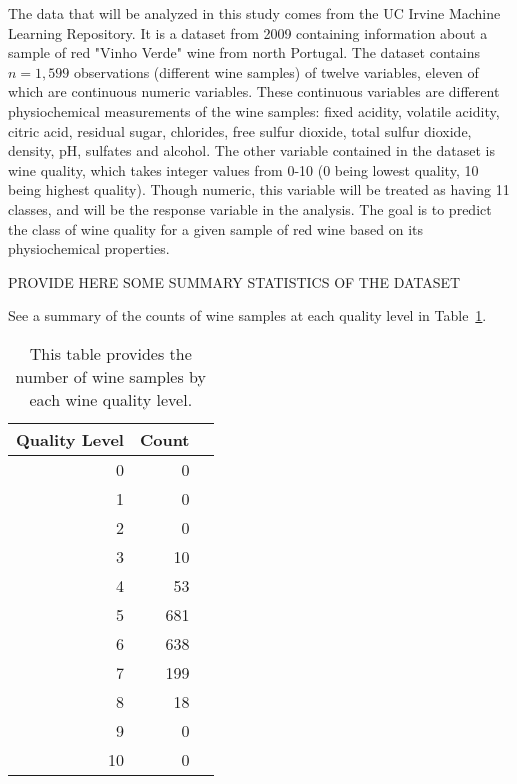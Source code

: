 \documentclass[12pt]{article}
\begin{document}
The data that will be analyzed in this study comes from the UC Irvine 
Machine Learning Repository.  It is a dataset from 2009 containing 
information about a sample of red "Vinho Verde" wine from north Portugal.  
The dataset contains $n=1,599$ observations (different wine samples) of 
twelve variables, eleven of which are continuous numeric variables.  
These continuous variables are different physiochemical measurements of 
the wine samples: fixed acidity, volatile acidity, citric acid, residual 
sugar, chlorides, free sulfur dioxide, total sulfur dioxide, density, 
pH, sulfates and alcohol.  The other variable contained in the dataset 
is wine quality, which takes integer values from 0-10 (0 being lowest 
quality, 10 being highest quality).  Though numeric, this variable will 
be treated as having 11 classes, and will be the response variable in 
the analysis.  The goal is to predict the class of wine quality for a 
given sample of red wine based on its physiochemical properties.  

PROVIDE HERE SOME SUMMARY STATISTICS OF THE DATASET

See a summary of the counts of wine samples at each quality level in 
Table~\ref{tab:qual}.
\begin{table}[tbp]
 \caption{This table provides the number of wine samples by each wine 
 quality level.}
\label{tab:qual}
\centering
\begin{tabular}{rrr}
 \toprule
 Quality Level & Count \\ 
 \midrule
0 & 0 \\ 
1 & 0 \\ 
2 & 0 \\ 
3 & 10 \\ 
4 & 53 \\ 
5 & 681 \\ 
6 & 638 \\ 
7 & 199 \\ 
8 & 18 \\ 
9 & 0 \\ 
10 & 0 \\
\bottomrule
\end{tabular}
\end{table}

\end{document}
